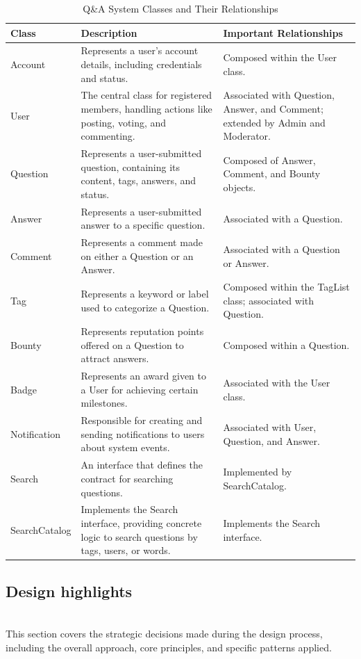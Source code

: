 \begin{table}[h!]
\centering
\begin{tabular}{|p{3.5cm}|p{6.5cm}|p{5.5cm}|}
\hline
\textbf{Class} & \textbf{Description} & \textbf{Important Relationships} \\
\hline
Account & Represents a user’s account details, including credentials and status. & Composed within the User class. \\
\hline
User & The central class for registered members, handling actions like posting, voting, and commenting. & Associated with Question, Answer, and Comment; extended by Admin and Moderator. \\
\hline
Question & Represents a user-submitted question, containing its content, tags, answers, and status. & Composed of Answer, Comment, and Bounty objects. \\
\hline
Answer & Represents a user-submitted answer to a specific question. & Associated with a Question. \\
\hline
Comment & Represents a comment made on either a Question or an Answer. & Associated with a Question or Answer. \\
\hline
Tag & Represents a keyword or label used to categorize a Question. & Composed within the TagList class; associated with Question. \\
\hline
Bounty & Represents reputation points offered on a Question to attract answers. & Composed within a Question. \\
\hline
Badge & Represents an award given to a User for achieving certain milestones. & Associated with the User class. \\
\hline
Notification & Responsible for creating and sending notifications to users about system events. & Associated with User, Question, and Answer. \\
\hline
Search & An interface that defines the contract for searching questions. & Implemented by SearchCatalog. \\
\hline
SearchCatalog & Implements the Search interface, providing concrete logic to search questions by tags, users, or words. & Implements the Search interface. \\
\hline
\end{tabular}
\caption{Q\&A System Classes and Their Relationships}
\label{tab:qa_classes}
\end{table}


\subsection{Design highlights}\label{pDELa9BpJsMwsR1ke5CpV}
\\
This section covers the strategic decisions made during the design process, including the overall approach, core principles, and specific patterns applied.

